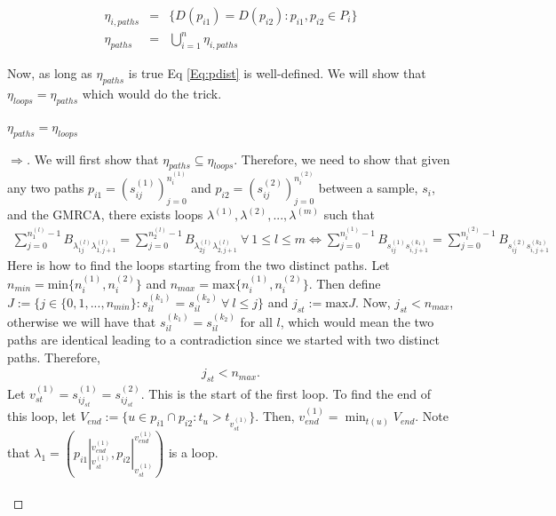 \begin{eqnarray*}
    \eta_{i, paths} &=& \{ \displaystyle D(p_{i1}) = D(p_{i2}): p_{i1}, p_{i2} \in P_i     \} \\
    \eta_{paths} &=& \displaystyle \bigcup_{i=1}^{n} \eta_{i,paths} 
\end{eqnarray*}

Now, as long as $\eta_{paths}$ is true Eq \ref{Eq:pdist} is well-defined. We will show that $\eta_{loops} = \eta_{paths}$ which would do the trick. 
 
\begin{lemma} $\eta_{paths} = \eta_{loops}$ 
\end{lemma}
\begin{proof}
[$\Rightarrow$] We will first show that $\eta_{paths} \subseteq \eta_{loops} $. Therefore, we need to show that given any two paths $p_{i1} = (s_{ij}^{(1) } )_{j=0}^{n_i^{(1)}}$ and $p_{i2} = (s_{ij}^{(2)} )_{j=0}^{n_i^{(2)}}$ between a sample, $s_i$, and the GMRCA, there exists loops $\lambda^{(1)},\lambda^{(2)},...,\lambda^{(m)}$ such that 
\begin{eqnarray*}
    \displaystyle \sum_{j=0}^{n_1^{(l)}-1} B_{\lambda_{1j}^{(l)} \lambda_{1,j+1}^{(l)} } = \sum_{j=0}^{n_2^{(l)}-1} B_{\lambda_{2j}^{(l)} \lambda_{2,j+1}^{(l)} } \ \forall \ 1 \leq l \leq m \Leftrightarrow \sum_{j=0}^{n_i^{(1)}-1} B_{s_{ij}^{(1)}  s_{i,j+1}^{(k_1)} } = \sum_{j=0}^{n_i^{(2)}-1} B_{s_{ij}^{(2)}  s_{i,j+1}^{(k_2)} }
\end{eqnarray*}
Here is how to find the loops starting from the two distinct paths. Let $n_{min} = \text{min}\{ n_i^{(1)},n_i^{(2)} \}$ and $n_{max} = \text{max}\{ n_i^{(1)},n_i^{(2)} \} $. Then define $J := \{ j \in \{0,1,...,n_{min} \} : s_{il}^{(k_1)} = s_{il}^{(k_2)} \ \forall \ l \leq j \}$ and $j_{st} := \text{max}J $. Now, $j_{st} < n_{max}$, otherwise we will have that $s_{il}^{(k_1)} = s_{il}^{(k_2)} $ for all $l$, which would mean the two paths are identical leading to a contradiction since we started with two distinct paths. Therefore,
\begin{eqnarray*}
    j_{st} < n_{max}.
\end{eqnarray*}
Let $v_{st}^{(1)} = s_{ij_{st}}^{(1)} = s_{ij_{st}}^{(2)} $. This is the start of the first loop. To find the end of this loop, let $V_{end} := \{ u \in p_{i1} \cap p_{i2} : t_u > t_{v_{st}^{(1)}} \} $. Then, $v_{end}^{(1)} = \displaystyle \min_{t(u)} V_{end} $. Note that $\lambda_1 = ( p_{i1}|_{v_{st}^{(1)}}^{v_{end}^{(1)}}, p_{i2}|_{v_{st}^{(1)}}^{v_{end}^{(1)}})$ is a loop. \\ \\ 

\end{proof}
